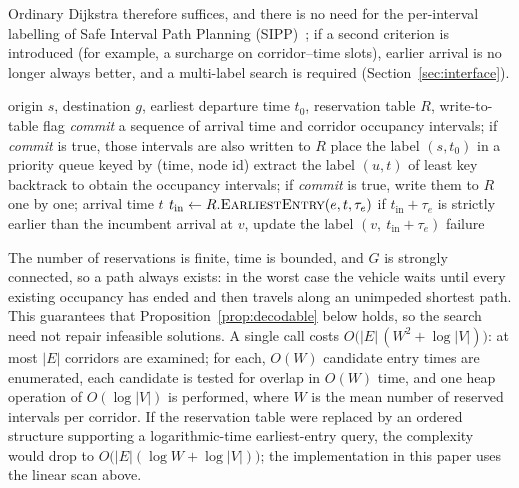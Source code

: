 Ordinary Dijkstra therefore suffices, and there is no need for the per-interval labelling of Safe Interval Path Planning (SIPP)~\cite{kasaura2022sipp}; if a second criterion is introduced (for example, a surcharge on corridor--time slots), earlier arrival is no longer always better, and a multi-label search is required (Section~\ref{sec:interface}).

\begin{algorithm}[t]
  \caption{\textsc{Route}: conflict-free planning of a single leg}
  \label{alg:route}
  \small
  \begin{algorithmic}[1]
  \Require origin $s$, destination $g$, earliest departure time $t_0$, reservation table $R$, write-to-table flag \textit{commit}
  \Ensure a sequence of arrival time and corridor occupancy intervals; if \textit{commit} is true, those intervals are also written to $R$
  \State place the label $(s,t_0)$ in a priority queue keyed by (time, node id)
    \State extract the label $(u,t)$ of least key
     \State backtrack to obtain the occupancy intervals; if \textit{commit} is true, write them to $R$ one by one;
         \Return arrival time $t$ \EndIf
      \State $t_{\text{in}} \gets R.\textsc{EarliestEntry}(e,t,\tau_e)$
      \State if $t_{\text{in}}+\tau_e$ is strictly earlier than the incumbent arrival at $v$, update the label $(v,\ t_{\text{in}}+\tau_e)$
    \EndFor
  \EndWhile
  \State \Return failure 
  \end{algorithmic}
\end{algorithm}

The number of reservations is finite, time is bounded, and $G$ is strongly connected, so a path always exists: in the worst case the vehicle waits until every existing occupancy has ended and then travels along an unimpeded shortest path.
This guarantees that Proposition~\ref{prop:decodable} below holds, so the search need not repair infeasible solutions.
A single call costs $O\bigl(|E|\,(W^{2}+\log|V|)\bigr)$: at most $|E|$ corridors are examined; for each, $O(W)$ candidate entry times are enumerated, each candidate is tested for overlap in $O(W)$ time,
and one heap operation of $O(\log|V|)$ is performed, where $W$ is the mean number of reserved intervals per corridor.
If the reservation table were replaced by an ordered structure supporting a logarithmic-time earliest-entry query, the complexity would drop to $O\bigl(|E|(\log W+\log|V|)\bigr)$; the implementation in this paper uses the linear scan above.

